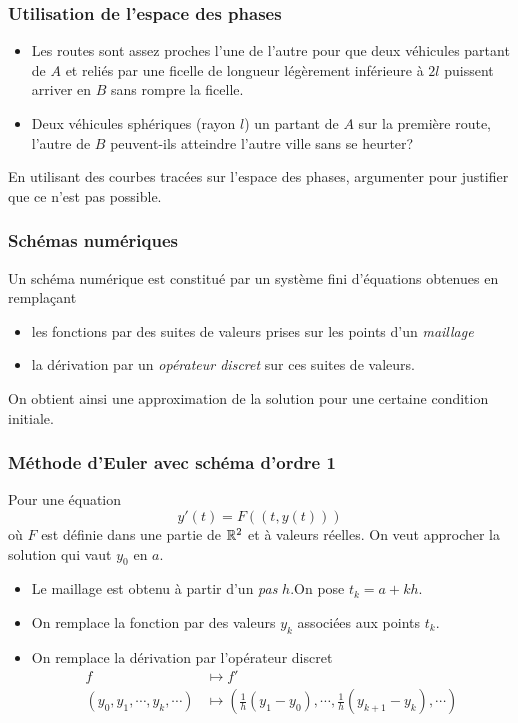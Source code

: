 \begin{frame}
\frametitle{Utilisation de l'espace des phases}
\begin{itemize}
  \item Les routes sont assez proches l'une de l'autre pour que deux véhicules partant de $A$ et reliés par une ficelle de longueur légèrement inférieure à $2l$ puissent arriver en $B$ sans rompre la ficelle.
  \item Deux véhicules sphériques (rayon $l$) un partant de $A$ sur la première route, l'autre de $B$ peuvent-ils atteindre l'autre ville sans se heurter?
\end{itemize}

En utilisant des courbes tracées sur l'espace des phases, argumenter pour justifier que ce n'est pas possible.
\end{frame}

\begin{frame}
  \frametitle{Schémas numériques}
Un schéma numérique est constitué par un système fini d'équations obtenues en remplaçant 
\begin{itemize}
  \item les fonctions par des suites de valeurs prises sur les points d'un \emph{maillage}
  \item la dérivation par un \emph{opérateur discret} sur ces suites de valeurs. 
\end{itemize}
On obtient ainsi une approximation de la solution pour une certaine condition initiale.
\end{frame}

\begin{frame}
  \frametitle{Méthode d'Euler avec schéma d'ordre 1}
Pour une équation
\begin{equation*}
  y'(t) = F((t,y(t)))
  \label{euler}
\end{equation*}
où $F$ est définie dans une partie de $\mathbb{R}^2$ et à valeurs réelles.\newline
On veut approcher la solution qui vaut $y_0$ en $a$.
\begin{itemize}
  \item Le maillage est obtenu à partir d'un  \emph{pas} $h$.\newline On pose $t_k = a + kh$.
  \item On remplace la fonction par des valeurs $y_k$ associées aux points $t_k$.
  \item On remplace la dérivation par l'opérateur discret 
  \begin{align*}
  f &\mapsto f'\\
(y_0,y_1,\cdots,y_k,\cdots)&\mapsto \left(\frac{1}{h}(y_1-y_0),\cdots, \frac{1}{h}(y_{k+1}-y_k),\cdots \right)      
  \end{align*}
\end{itemize}
\end{frame}

